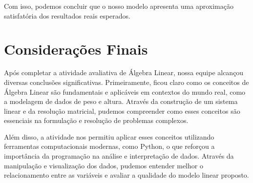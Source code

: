 \documentclass{article}
\begin{document}
    Com isso, podemos concluir que o nosso modelo apresenta uma aproximação satisfatória dos resultados reais esperados.


\section{Considerações Finais}
    Após completar a atividade avaliativa de Álgebra Linear, nossa equipe alcançou diversas conclusões significativas. Primeiramente, ficou claro como os conceitos de Álgebra Linear são fundamentais e aplicáveis em contextos do mundo real, como a modelagem de dados de peso e altura. Através da construção de um sistema linear e da resolução matricial, pudemos compreender como esses conceitos são essenciais na formulação e resolução de problemas complexos.

    Além disso, a atividade nos permitiu aplicar esses conceitos utilizando ferramentas computacionais modernas, como Python, o que reforçou a importância da programação na análise e interpretação de dados. Através da manipulação e visualização dos dados, pudemos entender melhor o relacionamento entre as variáveis e avaliar a qualidade do modelo linear proposto.
\end{document}

